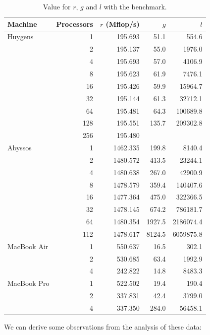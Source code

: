 \documentclass[a4paper,11pt]{article}
\begin{document}
\begin{table}[H]
\begin{center}
\begin{tabular}{|C{2.8cm}|r r r r|}
\hline
\textbf{Machine} & Processors & $r$ (Mflop/s) & $g$ & $l$ \\
\hline
Huygens & 1 & 195.693 & 51.1 & 554.6 \\
& 2 & 195.137 & 55.0 & 1976.0 \\
& 4 & 195.693 & 57.0 & 4106.9 \\
& 8 & 195.623 & 61.9 & 7476.1 \\
& 16 & 195.426 & 59.9 & 15964.7 \\
& 32 & 195.144 & 61.3 & 32712.1 \\
& 64 & 195.481 & 64.3 & 100689.8 \\
& 128 & 195.551 & 135.7 & 209302.8 \\
& 256 & 195.480 & & \\
\hline
Abyssos & 1 & 1462.335 & 199.8 & 8140.4 \\
& 2 & 1480.572 & 413.5 & 23244.1 \\
& 4 & 1480.638 & 267.0 & 42900.9 \\
& 8 & 1478.579 & 359.4 & 140407.6 \\
& 16 & 1477.364 & 475.0 & 322366.5 \\
& 32 & 1478.145 & 674.2 & 786181.7 \\
& 64 & 1480.354 & 1927.5 & 2186074.4 \\
& 112 & 1478.617 & 8124.5 & 6059875.8 \\
\hline
MacBook Air & 1 & 550.637 & 16.5 & 302.1 \\
& 2 & 530.685 & 63.4 & 1992.9 \\
& 4 & 242.822 & 14.8 & 8483.3 \\
\hline
MacBook Pro & 1 & 522.502 & 19.4 & 190.4 \\
& 2 & 337.831 & 42.4 & 3799.0 \\
& 4 & 337.350 & 284.0 & 56458.1 \\
\hline
\end{tabular}
\caption{Value for $r$, $g$ and $l$ with the benchmark.} \label{tab:bench}
\end{center}
\end{table}

We can derive some observations from the analysis of these data:
\end{document}
